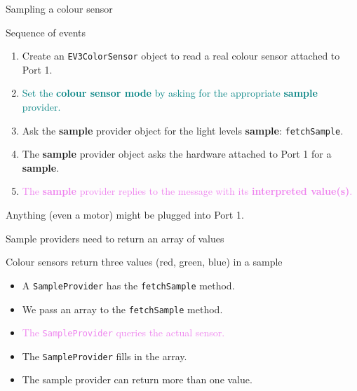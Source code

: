 \documentclass[color=pdftex,usenames,dvipsnames, aspectratio=169]{beamer}
\begin{document}
\begin{frame}{Sampling a colour sensor}
\begin{block}{Sequence of events}
\begin{enumerate}
\item Create an \lstinline!EV3ColorSensor! object to read a real colour sensor attached to Port 1.
\item \textcolor{teal}{Set the \textbf{colour sensor mode} by asking  for the appropriate  \textbf{sample} provider.}
\item Ask the \textbf{sample} provider object for the light levels \textbf{sample}: \lstinline!fetchSample!.
\item \textcolor{OliveGreen}{The \textbf{sample} provider object asks the hardware attached to Port 1 for a \textbf{sample}.}
\item \textcolor{violet}{The \textbf{sample} provider  replies to the message with its \textbf{interpreted value(s)}.}
\end{enumerate}

\begin{center}
\alert{Anything (even a motor) might be plugged into Port 1.}
\end{center}
\end{block}
\end{frame}

\begin{frame}{Sample providers need to return an array of values}
\begin{block}{Colour sensors return three values (red, green, blue) in a sample}
\begin{itemize}
  \item A \lstinline!SampleProvider! has the \lstinline!fetchSample! method.
\item We pass an array to the \lstinline!fetchSample! method.
\item \textcolor{violet}{The \lstinline!SampleProvider! queries the actual sensor.}
\item \textcolor{OliveGreen}{The \lstinline!SampleProvider! fills in the array.}
\item \textcolor{RedOrange}{The sample provider can return more than one value.}
\end{itemize}
\end{block}
\end{frame}
\end{document}
